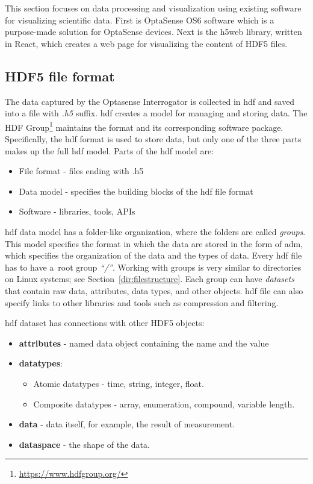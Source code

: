 This section focuses on data processing and visualization using existing software for visualizing scientific data. First is OptaSense OS6 software which is a purpose-made solution for OptaSense devices. Next is the h5web library, written in React, which creates a web page for visualizing the content of HDF5 files.



\subsection{HDF5 file format}\label{txt.hdf5}

The data captured by the Optasense Interrogator is collected in \ac{hdf} and saved into a file with \textit{.h5} suffix. \ac{hdf} creates a model for managing and storing data. The HDF Group\footnote{\url{https://www.hdfgroup.org/}} maintains the format and its corresponding software package. Specifically, the \ac{hdf} format is used to store data, but only one of the three parts makes up the full \ac{hdf} model. Parts of the \ac{hdf} model are:

\begin{itemize}
    \item File format - files ending with .h5
    \item Data model - specifies the building blocks of the \ac{hdf} file format
    \item Software - libraries, tools, APIs
\end{itemize}

\bigskip

\ac{hdf} data model has a folder-like organization, where the folders are called \textit{groups}. This model specifies the format in which the data are stored in the form of \ac{adm}, which specifies the organization of the data and the types of data. Every \ac{hdf} file has to have a~root group \textit{``/''}. Working with groups is very similar to directories on Linux systems; see Section~\ref{dir:filestructure}. Each group can have \textit{datasets} that contain raw data, attributes, data types, and other objects. \ac{hdf} file can also specify links to other libraries and tools such as compression and filtering.

\bigskip
\ac{hdf} dataset has connections with other HDF5 objects:

\begin{itemize}
    \item \textbf{attributes} - named data object containing the name and the value
    \item \textbf{datatypes}:
    \begin{itemize}
        \item Atomic datatypes - time, string, integer, float.
        \item Composite datatypes - array, enumeration, compound, variable length.
    \end{itemize}
    \item \textbf{data} - data itself, for example, the result of measurement.
    \item \textbf{dataspace} - the shape of the data.
\end{itemize}


